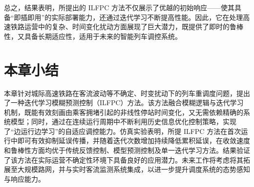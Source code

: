 总之，结果表明，所提出的 ILFPC 方法不仅展示了优越的初始响应——使其具备“即插即用”的实际部署能力，还通过迭代学习不断提高性能。因此，它在处理高速铁路运营中的复杂、时间变化扰动方面展现了巨大潜力，既提供了即时的鲁棒性，又具备长期适应性，适用于未来的智能列车调控系统。

\section{本章小结}
\label{section6}

本章针对城际高速铁路在客流波动等不确定、时变扰动下的列车重调度问题，提出了一种迭代学习模糊预测控制（ILFPC）方法。该方法融合模糊逻辑与迭代学习机制，既能有效刻画由乘客拥堵引起的非线性停站时间变化，又无需依赖精确的系统模型；同时，通过在连续运行周期中不断利用历史信息优化控制策略，实现了“边运行边学习”的自适应调控能力。仿真实验表明，所提 ILFPC 方法在首次运行中即可有效抑制延误传播，并随着迭代次数增加持续降低累积延误，在收敛速度和鲁棒性方面均优于传统反馈控制、模型预测控制及单一迭代学习方法。结果验证了该方法在实际运营不确定性环境下具备良好的应用潜力。未来工作将考虑将其拓展至大规模路网，并与实时客流监测系统集成，以进一步提升调度系统的态势感知与响应能力。
